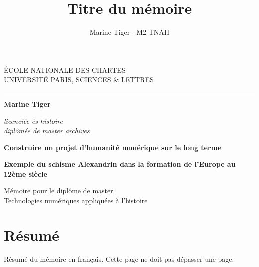 \documentclass[a4paper,12pt,twoside]{book}
\author{Marine Tiger - M2 TNAH}
\title{Titre du mémoire}
\begin{document}
	\begin{titlepage}
		\begin{center}
			
			\bigskip
			
			\begin{large}				
				ÉCOLE NATIONALE DES CHARTES\\
				UNIVERSITÉ PARIS, SCIENCES \& LETTRES
			\end{large}
			\begin{center}\rule{2cm}{0.02cm}\end{center}
			
			\bigskip
			\bigskip
			\bigskip
			\begin{Large}
				\textbf{Marine Tiger}\\
			\end{Large}
			\begin{normalsize} \textit{licenciée ès histoire}\\
				\textit{diplômée de master archives}
			\end{normalsize}
			
			\bigskip
			\bigskip
			\bigskip
			
			\begin{Huge}
				\textbf{Construire un projet d'humanité numérique sur le long terme}\\
			\end{Huge}
			\bigskip
			\bigskip
			\begin{LARGE}
				\textbf{Exemple du schisme Alexandrin dans la formation de l’Europe au 12ème siècle}\\
			\end{LARGE}
			
			\bigskip
			\bigskip
			\bigskip
			\begin{large}
			\end{large}
			\vfill
			
			\begin{large}
				Mémoire 
				pour le diplôme de master \\
				\og{} Technologies numériques appliquées à l'histoire \fg{} \\
			\end{large}
			
		\end{center}
	\end{titlepage}
	
	\thispagestyle{empty}	
	\cleardoublepage
	
	\frontmatter
	\chapter{Résumé}
	\medskip
	Résumé du mémoire en français. Cette page ne doit pas dépasser une page.\\
	
\end{document}
